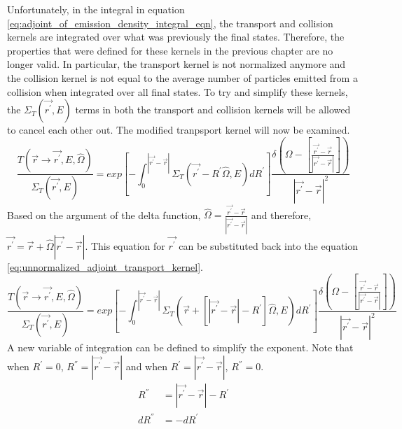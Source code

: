 Unfortunately, in the integral in equation 
\ref{eq:adjoint_of_emission_density_integral_eqn}, the transport and collision 
kernels are integrated over what was previously the final states. Therefore,
the properties that were defined for these kernels in the previous chapter are 
no longer valid. In particular, the transport kernel is not normalized anymore
and the collision kernel is not equal to the average number of particles 
emitted from a collision when integrated over all final states. To try and 
simplify these kernels, the $\Sigma_T(\vec{r^{'}},E)$ terms  in both the 
transport and collision kernels will be allowed to cancel each other out. The 
modified tranpsport kernel will now be examined.
\begin{equation}
  \frac{T(\vec{r} \to \vec{r^{'}},E,\hat{\Omega})}{\Sigma_T(\vec{r^{'}},E)} = 
  exp\left[-\int_0^{|\vec{r^{'}} - \vec{r}|} 
    \Sigma_T(\vec{r^{'}} - R^{'} \hat{\Omega},E)dR^{'} \right]
  \frac{\delta \left(\Omega - \left[\frac{\vec{r^{'}} - \vec{r}}
      {|\vec{r^{'}} - \vec{r}|}\right]\right)}
       {|\vec{r^{'}} - \vec{r}|^2}
  \label{eq:unnormalized_adjoint_transport_kernel}
\end{equation}
Based on the argument of the delta function, 
$\hat{\Omega} = \frac{\vec{r^{'}} - \vec{r}}{|\vec{r^{'}} - \vec{r}|}$ and 
therefore, $\vec{r^{'}} = \vec{r} + \hat{\Omega}|\vec{r^{'}} - \vec{r}|$. This
equation for $\vec{r^{'}}$ can be substituted back into the equation
\ref{eq:unnormalized_adjoint_transport_kernel}.
\begin{equation*}
  \frac{T(\vec{r} \to \vec{r^{'}},E,\hat{\Omega})}{\Sigma_T(\vec{r^{'}},E)} = 
  exp\left[-\int_0^{|\vec{r^{'}} - \vec{r}|} 
    \Sigma_T \left(\vec{r} + \left[|\vec{r^{'}} - \vec{r}| - R^{'} \right] 
    \hat{\Omega},E \right) dR^{'} 
    \right] \frac{\delta \left(\Omega - \left[\frac{\vec{r^{'}} - \vec{r}}
      {|\vec{r^{'}} - \vec{r}|}\right]\right)}
       {|\vec{r^{'}} - \vec{r}|^2}
\end{equation*}
A new variable of integration can be defined to simplify the exponent. Note
that when $R^{'} = 0$, $R^{''} = |\vec{r^{'}} - \vec{r}|$ and when 
$R^{'} = |\vec{r^{'}} - \vec{r}|$, $R^{''} = 0$.
\begin{align}
  R^{''} & = |\vec{r^{'}} - \vec{r}| - R^{'} \nonumber \\
  dR^{''} & = -dR^{'} \nonumber 
\end{align}
